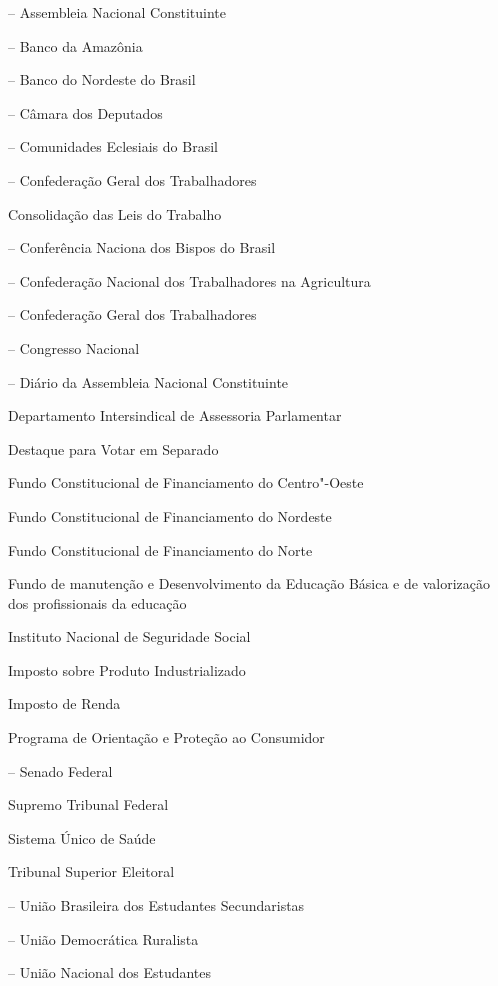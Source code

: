 \begin{Parskip}
 -- Assembleia Nacional Constituinte

 -- Banco da Amazônia

 -- Banco do Nordeste do Brasil

 -- Câmara dos Deputados

 -- Comunidades Eclesiais do Brasil

 -- Confederação Geral dos Trabalhadores

 Consolidação das Leis do Trabalho

 -- Conferência Naciona dos Bispos do Brasil

 -- Confederação Nacional dos Trabalhadores na
Agricultura

 -- Confederação Geral dos Trabalhadores

 -- Congresso Nacional

 -- Diário da Assembleia Nacional Constituinte

 Departamento Intersindical de Assessoria Parlamentar

 Destaque para Votar em Separado

 Fundo Constitucional de Financiamento do Centro"-Oeste

 Fundo Constitucional de Financiamento do Nordeste

 Fundo Constitucional de Financiamento do Norte

 Fundo de manutenção e Desenvolvimento da Educação
Básica e de valorização dos profissionais da educação

 Instituto Nacional de Seguridade Social

 Imposto sobre Produto Industrializado

 Imposto de Renda

 Programa de Orientação e Proteção ao Consumidor

 -- Senado Federal

 Supremo Tribunal Federal

 Sistema Único de Saúde

 Tribunal Superior Eleitoral

 -- União Brasileira dos Estudantes Secundaristas

 -- União Democrática Ruralista

 -- União Nacional dos Estudantes
\end{Parskip}

